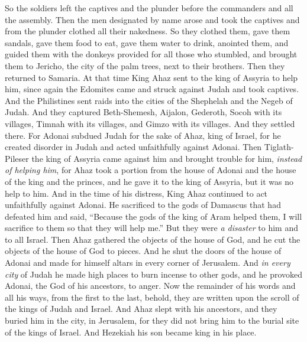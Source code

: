 \begin{biblechapter}
\verse So the soldiers left the captives and the plunder before the commanders and all the assembly.
\verse Then the men designated by name arose and took the captives and from the plunder clothed all their nakedness. So they clothed them, gave them sandals, gave them food to eat, gave them water to drink, anointed them, and guided them with the donkeys provided for all those who stumbled, and brought them to Jericho, the city of the palm trees, next to their brothers. Then they returned to Samaria.
\verse At that time King Ahaz sent to the king of Assyria to help him,
\verse since again the Edomites came and struck against Judah and took captives.
\verse And the Philistines sent raids into the cities of the Shephelah and the Negeb of Judah. And they captured Beth-Shemesh, Aijalon, Gederoth, Socoh with its villages, Timnah with its villages, and Gimzo with its villages. And they settled there.
\verse For Adonai subdued Judah for the sake of Ahaz, king of Israel, for he created disorder in Judah and acted unfaithfully against Adonai.
\verse Then Tiglath-Pileser the king of Assyria came against him and brought trouble for him, \textit{instead of helping him},
\verse for Ahaz took a portion from the house of Adonai and the house of the king and the princes, and he gave it to the king of Assyria, but it was no help to him.
\verse And in the time of his distress, King Ahaz continued to act unfaithfully against Adonai.
\verse He sacrificed to the gods of Damascus that had defeated him and said, “Because the gods of the king of Aram helped them, I will sacrifice to them so that they will help me.” But they were \textit{a disaster} to him and to all Israel.
\verse Then Ahaz gathered the objects of the house of God, and he cut the objects of the house of God to pieces. And he shut the doors of the house of Adonai and made for himself altars in every corner of Jerusalem.
\verse And \textit{in every city} of Judah he made high places to burn incense to other gods, and he provoked Adonai, the God of his ancestors, to anger.
\verse Now the remainder of his words and all his ways, from the first to the last, behold, they are written upon the scroll of the kings of Judah and Israel.
\verse And Ahaz slept with his ancestors, and they buried him in the city, in Jerusalem, for they did not bring him to the burial site of the kings of Israel. And Hezekiah his son became king in his place.
\end{biblechapter}

